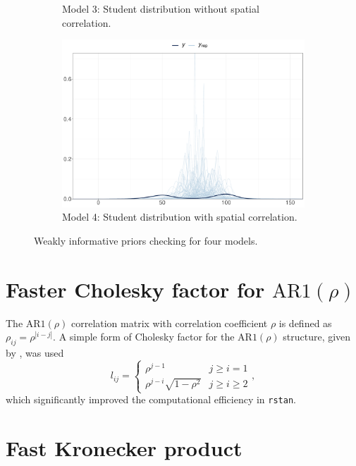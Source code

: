 \documentclass[a4paper]{article}   	%
\newcommand{\rstan}{\texttt{rstan}}
\newcommand{\AR}{\mathrm{AR}1}
\begin{document}
\begin{figure}[!htp]
\begin{subfigure}[t]{0.45\textwidth}
			\caption{Model 3: Student distribution without spatial correlation.}
		\end{subfigure}
		\begin{subfigure}[t]{0.45\textwidth}		
			\includegraphics[width=\linewidth]{Images/prior_STRand}
			\caption{Model 4: Student distribution with spatial correlation.}
		\end{subfigure}
		\caption{Weakly informative priors checking for four models. }\label{fig:priorcheck4models}
	\end{figure}
	
	
	\section{Faster Cholesky factor for $\AR(\rho)$}\label{sec:fastar1}
	
	The $\AR(\rho)$ correlation matrix with correlation coefficient $\rho$ is defined as $\rho_{ij} = \rho^{|i-j|}$. A simple form of Cholesky factor for the $\AR(\rho)$ structure, given by \textcite{Madar2015Direct}, was used 
	\begin{equation}
		l_{ij} = \begin{cases}
			\rho^{j-1} & j\geq i =1 \\
			\rho^{j-i} \sqrt{1-\rho^2} & j\geq i \geq2
		\end{cases},
	\end{equation}
	which significantly improved the computational efficiency in \rstan. 
	
	\section{Fast Kronecker product}\label{sec:kronec}
	
\end{document}
